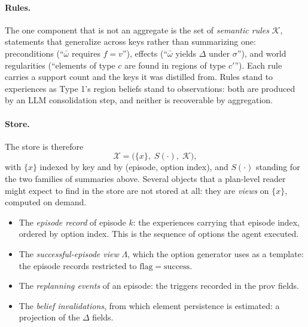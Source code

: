 \documentclass[11pt]{article}
\newcommand{\calK}{\mathcal{K}}
\newcommand{\calX}{\mathcal{X}}
\newcommand{\prov}{\mathrm{prov}}
\begin{document}
\paragraph{Rules.}
The one component that is not an aggregate is the set of \emph{semantic rules} $\calK$, statements that generalize across keys rather than summarizing one: preconditions (``$\bar\omega$ requires $f=v$''), effects (``$\bar\omega$ yields $\Delta$ under $\sigma$''), and world regularities (``elements of type $c$ are found in regions of type $c'$''). Each rule carries a support count and the keys it was distilled from. Rules stand to experiences as Type 1's region beliefs stand to observations: both are produced by an LLM consolidation step, and neither is recoverable by aggregation.

\paragraph{Store.}
The store is therefore
\begin{equation}
\calX=\big(\{x\},\;S(\cdot),\;\calK\big),
\label{eq:store2}
\end{equation}
with $\{x\}$ indexed by key and by (episode, option index), and $S(\cdot)$ standing for the two families of summaries above.
Several objects that a plan-level reader might expect to find in the store are not stored at all: they are \emph{views} on $\{x\}$, computed on demand.
\begin{itemize}[leftmargin=1.5em,itemsep=1pt]
\item The \emph{episode record} of episode $k$: the experiences carrying that episode index, ordered by option index. This is the sequence of options the agent executed.
\item The \emph{successful-episode view} $\Lambda$, which the option generator uses as a template: the episode records restricted to $\mathrm{flag}=\mathrm{success}$.
\item The \emph{replanning events} of an episode: the triggers recorded in the $\prov$ fields.
\item The \emph{belief invalidations}, from which element persistence is estimated: a projection of the $\Delta$ fields.
\end{itemize}
\end{document}
